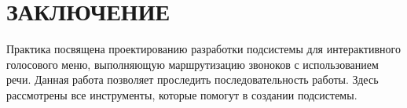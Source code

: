 \chapter{ЗАКЛЮЧЕНИЕ}
Практика посвящена проектированию разработки подсистемы для интерактивного
голосового меню, выполняющую маршрутизацию звоноков с использованием речи.
Данная работа позволяет проследить последовательность работы.
Здесь рассмотрены все инструменты, которые помогут в создании подсистемы.
